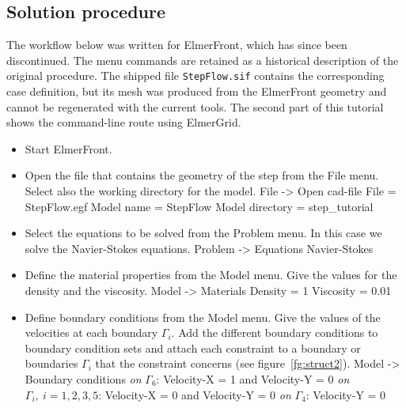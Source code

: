\subsection*{Solution procedure}

The workflow below was written for ElmerFront, which has since been
discontinued. The menu commands are retained as a historical description of
the original procedure. The shipped file \texttt{StepFlow.sif} contains the
corresponding case definition, but its mesh was produced from the ElmerFront
geometry and cannot be regenerated with the current tools. The second part of
this tutorial shows the command-line route using ElmerGrid.

\begin{itemize}
\item Start ElmerFront.
\item Open the file that contains the geometry of the step from 
the File menu. Select also the working directory for the model.
\ttbegin
File -> Open cad-file 
  File = StepFlow.egf 
  Model name = StepFlow 
  Model directory = step_tutorial
\ttend
\item Select the equations to be solved from the Problem menu. In this 
case we solve the Navier-Stokes equations.
\ttbegin
Problem -> Equations 
  Navier-Stokes 
\ttend
\item Define the material properties from the Model menu. Give the values for 
the density and the viscosity.
\ttbegin
Model -> Materials 
  Density = 1 
  Viscosity = 0.01
\ttend
\item Define boundary conditions from the Model menu. Give the values of 
the velocities at each boundary \begin{math}\Gamma_i\end{math}. Add the 
different boundary conditions to boundary condition sets and attach each 
constraint to a boundary or boundaries \begin{math}\Gamma_i\end{math} that 
the constraint concerns (see figure~\ref{fg:struct2}).
\ttbegin
Model -> Boundary conditions 
  {\it on }\begin{math}{\Gamma_6}\end{math}: Velocity-X = 1 and Velocity-Y = 0 
  {\it on }\begin{math}\Gamma_i,\: i=1,2,3,5\end{math}: Velocity-X = 0 and Velocity-Y = 0 
  {\it on }\begin{math}\Gamma_4\end{math}: Velocity-Y = 0

\end{itemize}
